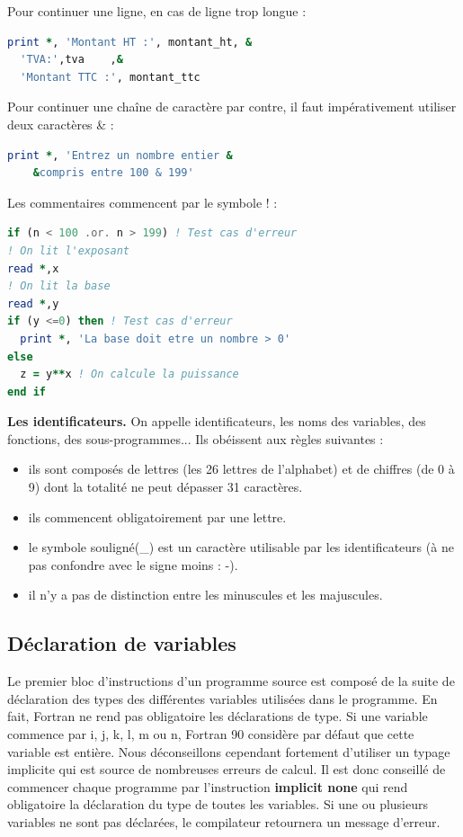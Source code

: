 \documentclass[a4paper,twoside]{article}
\begin{document}
Pour continuer une ligne, en cas de ligne trop longue : 
\begin{lstlisting}[language=Fortran]
print *, 'Montant HT :', montant_ht, & 
  'TVA:',tva	,&
  'Montant TTC :', montant_ttc
\end{lstlisting}

\bigskip

Pour continuer une chaîne de caractère par contre, il faut impérativement utiliser deux caractères \og \& \fg : 
\begin{lstlisting}[language=Fortran]
print *, 'Entrez un nombre entier & 
	&compris entre 100 & 199'
\end{lstlisting}

\bigskip

Les commentaires commencent par le symbole \og ! \fg : 
\begin{lstlisting}[language=Fortran]
if (n < 100 .or. n > 199) ! Test cas d'erreur
! On lit l'exposant
read *,x 
! On lit la base
read *,y 
if (y <=0) then ! Test cas d'erreur 
  print *, 'La base doit etre un nombre > 0'
else 
  z = y**x ! On calcule la puissance
end if
\end{lstlisting}

\bigskip

\textbf{Les identificateurs.} On appelle identificateurs, les noms des variables, des fonctions, des
sous-programmes... Ils obéissent aux règles suivantes :
\begin{itemize}
\item ils sont composés de lettres (les 26 lettres de l'alphabet) et de chiffres (de 0 à 9) dont la totalité ne peut dépasser 31 caractères.
\item ils commencent obligatoirement par une lettre.
\item le symbole \og souligné\fg (\_) est un caractère utilisable par les identificateurs (à ne pas confondre avec le signe moins : \og -\fg).
\item il n'y a pas de distinction entre les minuscules et les majuscules.
\end{itemize}

\subsection{Déclaration de variables}
Le premier bloc d'instructions d'un programme source est composé de la suite de déclaration des types des différentes variables utilisées dans le programme. En fait, Fortran ne rend pas obligatoire les déclarations de type. Si une variable commence par i, j, k, l, m ou n, Fortran 90 considère par défaut que cette variable est entière. Nous déconseillons cependant fortement d'utiliser un typage implicite qui est source de nombreuses erreurs de calcul. Il est donc conseillé de commencer chaque programme par l'instruction \textbf{implicit none} qui rend obligatoire la déclaration du type de toutes les variables. Si une ou plusieurs variables ne sont pas déclarées, le compilateur retournera un message d'erreur.
\end{document}
